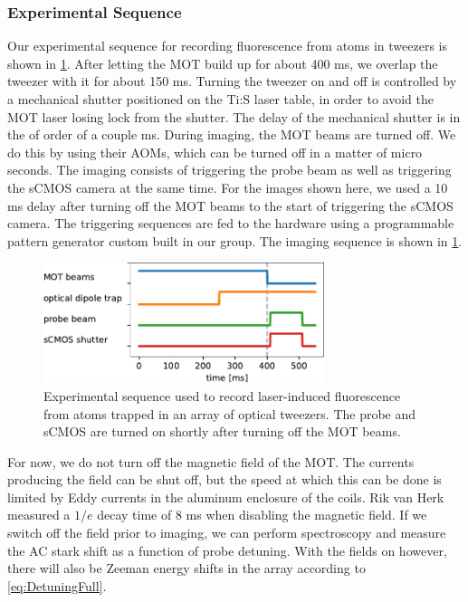 \subsubsection*{Experimental Sequence}

Our experimental sequence for recording fluorescence from atoms in tweezers is shown in \cref{fig:Sequence}.
After letting the MOT build up for about 400 ms, we overlap the tweezer with it for about 150 ms.
Turning the tweezer on and off is controlled by a mechanical shutter positioned on the \ac{Ti:S} laser table, in order to avoid the MOT laser losing lock from the shutter.
The delay of the mechanical shutter is in the of order of a couple ms. 
During imaging, the MOT beams are turned off.
We do this by using their \ac{AOM}s, which can be turned off in a matter of micro seconds. 
The imaging consists of triggering the probe beam as well as triggering the sCMOS camera at the same time. 
For the images shown here, we used a 10 ms delay after turning off the MOT beams to the start of triggering the sCMOS camera. 
The triggering sequences are fed to the hardware using a programmable pattern generator custom built in our group. 
The imaging sequence is shown in \cref{fig:Sequence}.
\begin{figure}
    \centering
    \includegraphics[width=0.73\textwidth]{figures/Sequence.pdf}
    \caption{Experimental sequence used to record laser-induced fluorescence from atoms trapped in an array of optical tweezers.
    The probe and sCMOS are turned on shortly after turning off the MOT beams. }
    \label{fig:Sequence}
\end{figure}
For now, we do not turn off the magnetic field of the MOT.
The currents producing the field can be shut off, but the speed at which this can be done is limited by Eddy currents in the aluminum enclosure of the coils. 
Rik van Herk measured a $1/e$ decay time of 8 ms when disabling the magnetic field.
If we switch off the field prior to imaging, we can perform spectroscopy and measure the AC stark shift as a function of probe detuning. 
With the fields on however, there will also be Zeeman energy shifts in the array according to \cref{eq:DetuningFull}. 

